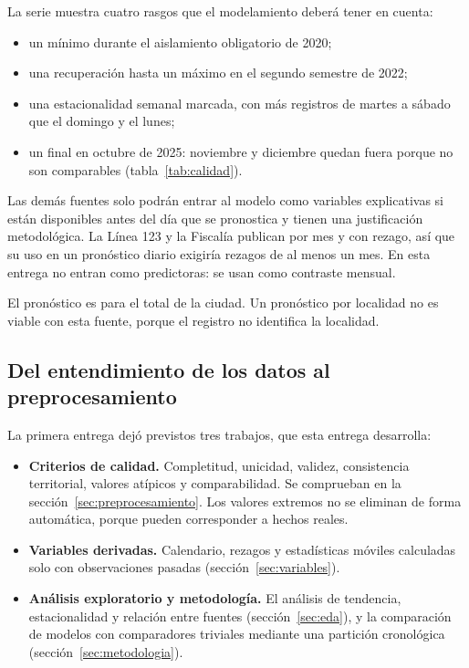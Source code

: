La serie muestra cuatro rasgos que el modelamiento deberá tener en cuenta:
\begin{itemize}
  \item un mínimo durante el aislamiento obligatorio de 2020;
  \item una recuperación hasta un máximo en el segundo semestre de 2022;
  \item una estacionalidad semanal marcada, con más registros de martes a sábado que el domingo y el lunes;
  \item un final en octubre de 2025: noviembre y diciembre quedan fuera porque no son comparables (tabla~\ref{tab:calidad}).
\end{itemize}

Las demás fuentes solo podrán entrar al modelo como variables explicativas si están disponibles antes del día que se pronostica y tienen una justificación metodológica. La Línea 123 y la Fiscalía publican por mes y con rezago, así que su uso en un pronóstico diario exigiría rezagos de al menos un mes. En esta entrega no entran como predictoras: se usan como contraste mensual.

El pronóstico es para el total de la ciudad. Un pronóstico por localidad no es viable con esta fuente, porque el registro no identifica la localidad.

\subsection{Del entendimiento de los datos al preprocesamiento}

La primera entrega dejó previstos tres trabajos, que esta entrega desarrolla:
\begin{itemize}
  \item \textbf{Criterios de calidad.} Completitud, unicidad, validez, consistencia territorial, valores atípicos y comparabilidad. Se comprueban en la sección~\ref{sec:preprocesamiento}. Los valores extremos no se eliminan de forma automática, porque pueden corresponder a hechos reales.
  \item \textbf{Variables derivadas.} Calendario, rezagos y estadísticas móviles calculadas solo con observaciones pasadas (sección~\ref{sec:variables}).
  \item \textbf{Análisis exploratorio y metodología.} El análisis de tendencia, estacionalidad y relación entre fuentes (sección~\ref{sec:eda}), y la comparación de modelos con comparadores triviales mediante una partición cronológica (sección~\ref{sec:metodologia}).
\end{itemize}

